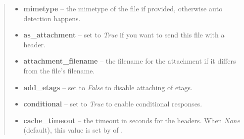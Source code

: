 \documentclass[a4paper,12pt]{sphinxmanual}
\begin{document}
\begin{fulllineitems}
\begin{quote}
\begin{description}
\begin{itemize}
\item {} 
\textbf{mimetype} -- the mimetype of the file if provided, otherwise
auto detection happens.

\item {} 
\textbf{as\_attachment} -- set to \emph{True} if you want to send this file with
a  header.

\item {} 
\textbf{attachment\_filename} -- the filename for the attachment if it
differs from the file's filename.

\item {} 
\textbf{add\_etags} -- set to \emph{False} to disable attaching of etags.

\item {} 
\textbf{conditional} -- set to \emph{True} to enable conditional responses.

\item {} 
\textbf{cache\_timeout} -- the timeout in seconds for the headers. When \emph{None}
(default), this value is set by
{\hyperref[api:flask.Flask.get_send_file_max_age]{}} of
{\hyperref[api:flask.current_app]{}}.

\end{itemize}

\end{description}\end{quote}

\end{fulllineitems}

\end{document}

